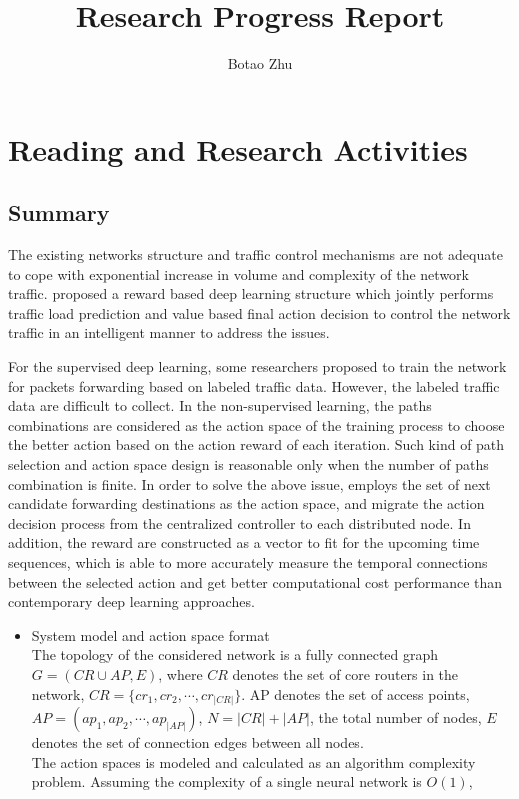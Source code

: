 \documentclass[11pt]{report}
\title{Research Progress Report}
\author{Botao Zhu}
\begin{document}
	
	\maketitle
	 \chead{} 
	 \cfoot{} 
	\renewcommand{\footrulewidth}{1.0pt}
	\renewcommand{\headrulewidth}{2.0pt}
	\renewcommand{\arraystretch}{1.3}
	\pagestyle{fancy}
	
	\renewcommand{\thesection}{\arabic{section}}
	
	\section{Reading and Research Activities}
	
	\subsection{Summary}
	
	The existing networks structure and traffic control mechanisms are not adequate to cope with exponential increase in volume and complexity of the network traffic. \cite{8489985} proposed a reward based deep learning structure which jointly performs traffic load prediction and value based final action decision to control the network traffic in an intelligent manner to address the issues.
	
	\noindent For the supervised deep learning, some researchers proposed to train the network for packets forwarding based on labeled traffic data. However, the labeled traffic data are difficult to collect. In the non-supervised learning, the paths combinations are considered as the action space of the training process to choose the better action based on the action reward of each iteration. Such kind of path selection and action space design is reasonable only when the number of paths combination is finite. In order to solve the above issue, \cite{8489985} employs the set of next candidate forwarding destinations as the action space, and migrate the action decision process from the centralized controller to each distributed node. In addition, the reward are constructed as a vector to fit for the upcoming time sequences, which is able to more accurately measure the temporal connections between the selected action and get better computational cost performance than contemporary deep learning approaches.
	\begin{itemize}
		\item System model and action space format\\
		The topology of the considered network is a fully connected graph $G=\left(CR\cup AP,E\right)$, where $CR$ denotes the set of core routers in the network, $CR=\{cr_1,cr_2, \cdots, cr_{|CR|}\}$. AP denotes the set of access points, $AP=\left(ap_1,ap_2,\cdots,ap_{|AP|}\right)$, $N=|CR|+|AP|$, the total number of nodes, $E$ denotes the set of connection edges between all nodes. \\
		The action spaces is modeled and calculated as an algorithm complexity problem. Assuming the complexity of a single neural network is $\mathit{O}\left(1\right)$, 
	\end{itemize}
	
\end{document}
